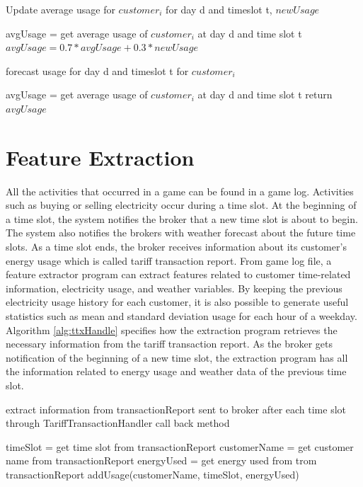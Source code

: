 \begin{algorithm}
\caption{Update average usage for $customer_i$ for day d and timeslot t, $newUsage$}
\begin{algorithmic} [1]
\STATE avgUsage = get average usage of $customer_i$ at day d and time slot t
\STATE $avgUsage = 0.7 * avgUsage + 0.3 * newUsage$
\end{algorithmic}
\label{alg:updateAvgMovingAvg}
\end{algorithm}

\begin{algorithm}
\caption{forecast usage for day d and timeslot t for $customer_i$}
\begin{algorithmic} [1]
\STATE avgUsage = get average usage of $customer_i$ at day d and time slot t 
\STATE return $avgUsage$
\end{algorithmic}
 \label{alg:predictAvgMovingAvg}
\end{algorithm}

\section{Feature Extraction}
	All the activities that occurred in a game can be found in a game log.  Activities such as buying or selling electricity occur during a time slot. At the beginning of a time slot, the system notifies the broker that a new time slot is about to begin. The system also notifies the brokers with weather forecast about the future time slots. As a time slot ends, the broker receives information about its customer's energy usage which is called tariff transaction report. From game log file, a feature extractor program can extract features related to customer time-related information, electricity usage, and weather variables. By keeping the previous electricity usage  history for each customer, it is also possible to generate useful statistics such as mean and standard deviation usage for each hour of a weekday. Algorithm \ref{alg:ttxHandle} specifies how the extraction program retrieves the necessary information from the tariff transaction report. As the broker gets notification of the beginning of a new time slot, the extraction program has all the information related to energy usage and weather data of the previous time slot. 
\begin{algorithm}[!h]
\caption{extract information from transactionReport sent to broker after each time slot through TariffTransactionHandler call back method}
\begin{algorithmic} [1]
\STATE timeSlot = get time slot from transactionReport
\STATE customerName = get customer name from transactionReport
\STATE energyUsed = get energy used from trom transactionReport
\STATE addUsage(customerName, timeSlot, energyUsed)
\end{algorithmic}
 \label{alg:ttxHandle}
\end{algorithm}

